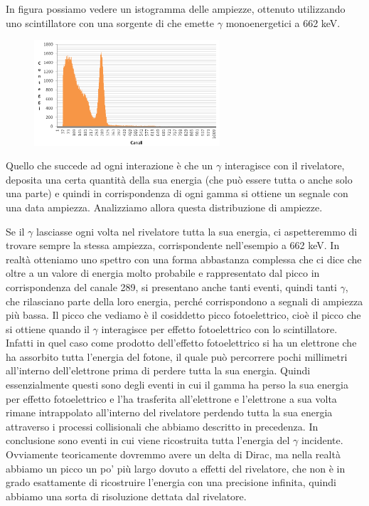 \begin{esempio}\label{es:distr_ampiezze_cesio}
   In figura possiamo vedere un istogramma delle ampiezze, ottenuto utilizzando uno scintillatore con una sorgente di  che emette $\gamma$ monoenergetici a 662 keV.

\begin{figure}[H]
   \centering
   \includegraphics[width=0.615\textwidth]{immagini/distribuzione_ampiezze_impulsi_es_1.png}
\end{figure}

Quello che succede ad ogni interazione è che un $\gamma$ interagisce con il rivelatore, deposita una certa quantità della sua energia (che può essere tutta o anche solo una parte) e quindi in corrispondenza di ogni gamma si ottiene un segnale con una data ampiezza. Analizziamo allora questa distribuzione di ampiezze.

Se il $\gamma$ lasciasse ogni volta nel rivelatore tutta la sua energia, ci aspetteremmo di trovare sempre la stessa ampiezza, corrispondente nell'esempio a 662 keV. In realtà otteniamo uno spettro con una forma abbastanza complessa che ci dice che oltre a un valore di energia molto probabile e rappresentato dal picco in corrispondenza del canale 289, si presentano anche tanti eventi, quindi tanti $\gamma$, che rilasciano parte della loro energia, perché corrispondono a segnali di ampiezza più bassa. Il picco che vediamo è il cosiddetto picco fotoelettrico, cioè il picco che si ottiene quando il $\gamma$ interagisce per effetto fotoelettrico con lo scintillatore. Infatti in quel caso come prodotto dell'effetto fotoelettrico si ha un elettrone che ha assorbito tutta l'energia del fotone, il quale può percorrere pochi millimetri all'interno dell'elettrone prima di perdere tutta la sua energia. Quindi essenzialmente questi sono degli eventi in cui il gamma ha perso la sua energia per effetto fotoelettrico e l'ha trasferita all'elettrone e l'elettrone a sua volta rimane intrappolato all'interno del rivelatore perdendo tutta la sua energia attraverso i processi collisionali che abbiamo descritto in precedenza. In conclusione sono eventi in cui viene ricostruita tutta l'energia del $\gamma$ incidente. Ovviamente teoricamente dovremmo avere un delta di Dirac\footnotemark, ma nella realtà abbiamo un picco un po' più largo dovuto a effetti del rivelatore, che non è in grado esattamente di ricostruire l'energia con una precisione infinita, quindi abbiamo una sorta di risoluzione dettata dal rivelatore.


\end{esempio}
